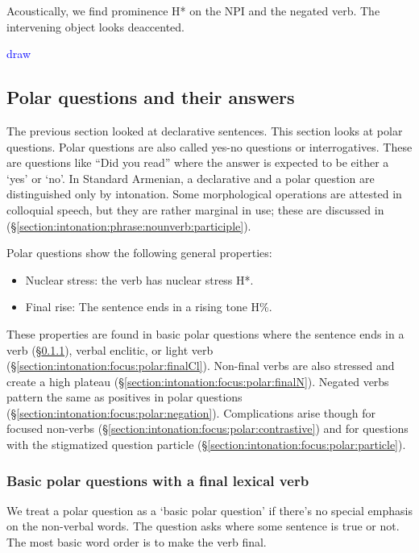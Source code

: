 Acoustically, we find prominence H* on the NPI and the negated verb. The intervening object looks deaccented. 

\textcolor{blue}{draw}



\subsection{Polar questions and their answers}\label{section:intonation:focus:polar}

The previous section looked at declarative sentences. This section looks at polar questions. 
Polar questions are also called yes-no questions or interrogatives. These are questions like ``Did you read'' where the answer is expected to be either a `yes' or `no'. In Standard Armenian, a declarative and a polar question are distinguished only by intonation. Some morphological operations are attested in colloquial speech, but they are rather marginal in use; these are discussed in (\S\ref{section:intonation:phrase:nounverb:participle}).


Polar questions show the following general properties:
\begin{itemize}[noitemsep, topsep=0pt]
	\item Nuclear stress: the verb has nuclear stress H*. 
	\item Final rise: The sentence ends in a rising tone H\%.
\end{itemize}

These properties are found in basic polar questions where the sentence ends in a verb (\S\ref{section:intonation:focus:polar:finalV}), verbal enclitic, or light verb  (\S\ref{section:intonation:focus:polar:finalCl}). Non-final verbs are also stressed and create a high plateau  (\S\ref{section:intonation:focus:polar:finalN}). Negated verbs pattern the same as positives in polar questions  (\S\ref{section:intonation:focus:polar:negation}). Complications arise though for focused non-verbs  (\S\ref{section:intonation:focus:polar:contrastive}) and for questions with the stigmatized question particle  (\S\ref{section:intonation:focus:polar:particle}). 


\subsubsection{Basic polar questions with a final lexical verb}\label{section:intonation:focus:polar:finalV} 

We treat a  polar question as a `basic polar question' if there's no special emphasis on the non-verbal words.  The question asks where some sentence is true or not. The most basic word order is to make the verb final. 


